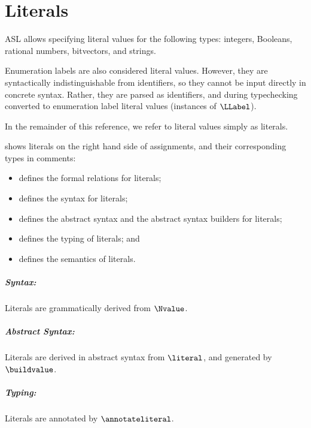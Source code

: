 \chapter{Literals\label{chap:Literals}}
ASL allows specifying literal values for the following types:
integers, Booleans, rational numbers, bitvectors, and strings.

Enumeration labels are also considered literal values.
However, they are syntactically indistinguishable from identifiers,
so they cannot be input directly in concrete syntax.
Rather, they are parsed as identifiers, and during typechecking
converted to enumeration label literal values (instances of $\LLabel$).

In the remainder of this reference, we refer to literal values simply as literals.

 shows literals on the right hand side of assignments,
and their corresponding types in comments:

\ChapterOutline
\begin{itemize}
  \item {} defines the formal relations for literals;
  \item {} defines the syntax for literals;
  \item {} defines the abstract syntax and the abstract syntax builders for literals;
  \item {} defines the typing of literals; and
  \item {} defines the semantics of literals.
\end{itemize}

\paragraph{Syntax:} Literals are grammatically derived from $\Nvalue$.
\paragraph{Abstract Syntax:} Literals are derived in abstract syntax from $\literal$,
  and generated by $\buildvalue$.
\paragraph{Typing:} Literals are annotated by $\annotateliteral$.
